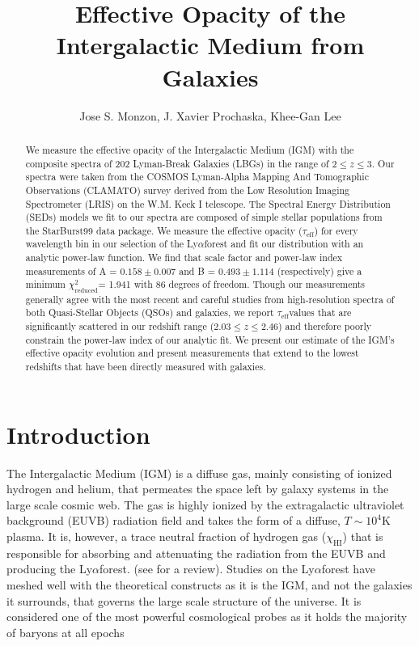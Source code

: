 \documentclass[preprint2,times,tighten]{aastex6}
\newcommand{\teff}{$\tau_\mathrm{eff}$\space}
\newcommand{\lya}{Ly$\alpha$\space}
\newcommand{\rchi}{$\chi^{2}_\mathrm{reduced}$}
\begin{document}
\title{Effective Opacity of the Intergalactic Medium from Galaxies}

\author{ Jose S. Monzon,
J. Xavier Prochaska, Khee-Gan Lee}


\begin{abstract}
We measure the effective opacity of the Intergalactic Medium (IGM) with the composite spectra of 202 Lyman-Break Galaxies (LBGs) in the range of $2 \leq z \leq 3$. Our spectra were taken from the COSMOS Lyman-Alpha Mapping And Tomographic Observations (CLAMATO) survey derived from the Low Resolution Imaging Spectrometer (LRIS) on the W.M. Keck I telescope. The Spectral Energy Distribution (SEDs) models we fit to our spectra are composed of simple stellar populations from the StarBurst99 data package. We measure the effective opacity (\teff) for every wavelength bin in our selection of the \lya forest and fit our distribution with an analytic power-law function. We find that scale factor and power-law index measurements of A = $0.158 \pm 0.007$  and B = $0.493 \pm 1.114$ (respectively) give a minimum \rchi = 1.941 with 86 degrees of freedom. Though our measurements generally agree with the most recent and careful studies from high-resolution spectra of both Quasi-Stellar Objects (QSOs) and galaxies, we report \teff values that are significantly scattered in our redshift range ($2.03 \leq z \leq 2.46$) and therefore poorly constrain the power-law index of our analytic fit. We present our estimate of the IGM's effective opacity evolution and present measurements that extend to the lowest redshifts that have been directly measured with galaxies.
\end{abstract}

 

\section{Introduction}%
\label{sec:intro}

The Intergalactic Medium (IGM) is a diffuse gas, mainly consisting of ionized hydrogen and helium, that permeates the space left by galaxy systems in the large scale cosmic web. The gas is highly ionized by the extragalactic ultraviolet background (EUVB) radiation field and takes the form of a diffuse, $T\sim 10^4$K plasma. It is, however, a trace neutral fraction of hydrogen gas ($\chi_\mathrm{HI}$) that is responsible for absorbing and attenuating the radiation from the EUVB and producing the \lya forest. (see \cite{McQuinn_2016} for a review). Studies on the \lya forest have meshed well with the theoretical constructs as it is the IGM, and not the galaxies it surrounds, that governs the large scale structure of the universe. It is considered one of the most powerful cosmological probes as it holds the majority of baryons at all epochs \citep{2007ApJ...662...72B} 
\end{document}
